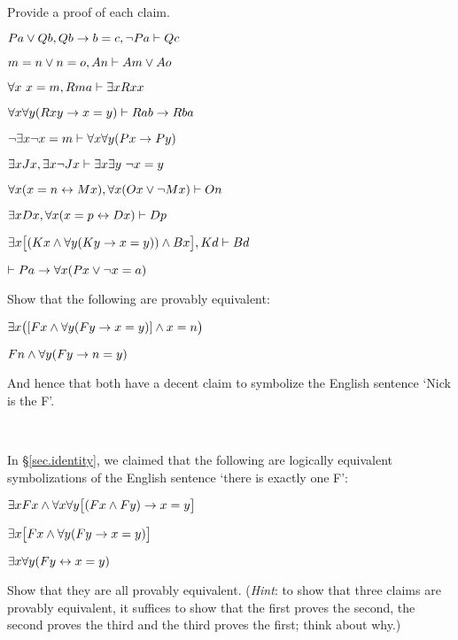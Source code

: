 \practiceproblems
\problempart
\label{pr.identity}
Provide a proof of each claim.
\begin{earg}
\item $Pa \vee Qb, Qb \rightarrow b=c, \neg Pa \vdash Qc$
\item $m=n \vee n=o, An \vdash Am \vee Ao$
\item $\forall x\ x=m, Rma\vdash \exists x Rxx$
\item $\forall x\forall y(Rxy \rightarrow x=y)\vdash Rab \rightarrow Rba$
\item $\neg \exists x\neg x = m \vdash \forall x\forall y (Px \rightarrow Py)$
\item $\exists x Jx, \exists x \neg Jx\vdash \exists x \exists y\ \neg x = y$
\item $\forall x(x=n \leftrightarrow Mx), \forall x(Ox \vee \neg Mx)\vdash On$
\item $\exists x Dx, \forall x(x=p \leftrightarrow Dx)\vdash Dp$
\item $\exists x\bigl[(Kx \wedge \forall y(Ky \rightarrow x=y)) \wedge Bx\bigr], Kd\vdash Bd$
\item $\vdash Pa \rightarrow \forall x(Px \vee \neg x = a)$
\end{earg}

\problempart
Show that the following are provably equivalent:
\begin{ebullet}
\item $\exists x \bigl([Fx \wedge \forall y (Fy \rightarrow x = y)] \wedge x = n\bigr)$
\item $Fn \wedge \forall y (Fy \rightarrow n= y)$
\end{ebullet}
And hence that both have a decent claim to symbolize the English sentence `Nick is the F'.

\

\problempart
In \S\ref{sec.identity}, we claimed that the following are logically equivalent symbolizations of the English sentence `there is exactly one F':
\begin{ebullet}
\item $\exists x Fx \wedge \forall x \forall y \bigl[(Fx \wedge Fy) \rightarrow x = y\bigr]$
\item $\exists x \bigl[Fx \wedge \forall y (Fy \rightarrow x = y)\bigr]$
\item $\exists x \forall y (Fy \leftrightarrow x = y)$
\end{ebullet}
Show that they are all provably equivalent. (\emph{Hint}: to show that three claims are provably equivalent, it suffices to show that the first proves the second, the second proves the third and the third proves the first; think about why.)


